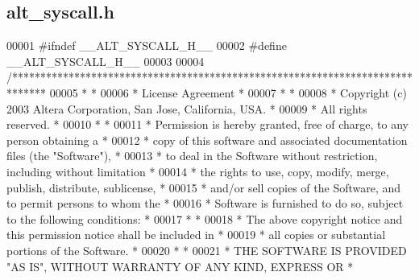\subsection{alt\+\_\+syscall.\+h}
\label{alt__syscall_8h_source}

\begin{DoxyCode}
00001 \textcolor{preprocessor}{#ifndef \_\_ALT\_SYSCALL\_H\_\_}
00002 \textcolor{preprocessor}{#define \_\_ALT\_SYSCALL\_H\_\_}
00003 
00004 \textcolor{comment}{/******************************************************************************}
00005 \textcolor{comment}{*                                                                             *}
00006 \textcolor{comment}{* License Agreement                                                           *}
00007 \textcolor{comment}{*                                                                             *}
00008 \textcolor{comment}{* Copyright (c) 2003 Altera Corporation, San Jose, California, USA.           *}
00009 \textcolor{comment}{* All rights reserved.                                                        *}
00010 \textcolor{comment}{*                                                                             *}
00011 \textcolor{comment}{* Permission is hereby granted, free of charge, to any person obtaining a     *}
00012 \textcolor{comment}{* copy of this software and associated documentation files (the "Software"),  *}
00013 \textcolor{comment}{* to deal in the Software without restriction, including without limitation   *}
00014 \textcolor{comment}{* the rights to use, copy, modify, merge, publish, distribute, sublicense,    *}
00015 \textcolor{comment}{* and/or sell copies of the Software, and to permit persons to whom the       *}
00016 \textcolor{comment}{* Software is furnished to do so, subject to the following conditions:        *}
00017 \textcolor{comment}{*                                                                             *}
00018 \textcolor{comment}{* The above copyright notice and this permission notice shall be included in  *}
00019 \textcolor{comment}{* all copies or substantial portions of the Software.                         *}
00020 \textcolor{comment}{*                                                                             *}
00021 \textcolor{comment}{* THE SOFTWARE IS PROVIDED "AS IS", WITHOUT WARRANTY OF ANY KIND, EXPRESS OR  *}

\end{DoxyCode}
